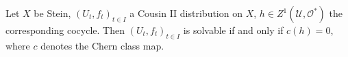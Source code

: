 Let $X$ be Stein, $(U_t, f_t)_{t \in I}$ a Cousin II distribution on $X$, $h \in Z^1(\mathcal{U}, \mathcal{O}^*)$ the corresponding cocycle. Then $(U_t, f_t)_{t \in I}$ is solvable if and only if $c(h) = 0$, where $c$ denotes the Chern class map.

